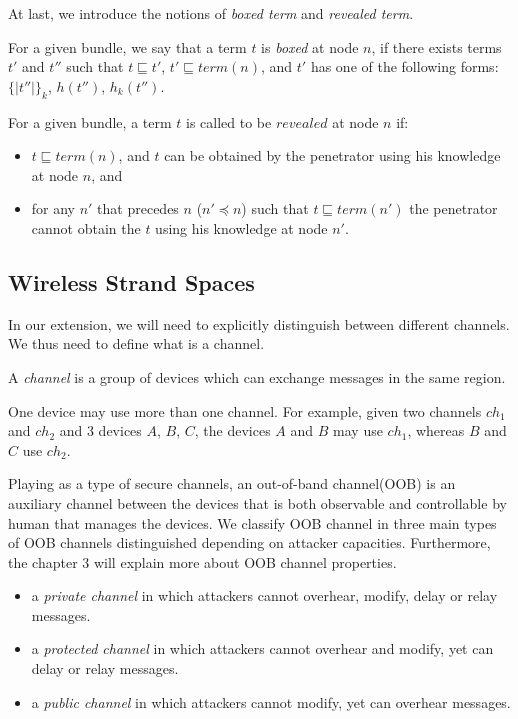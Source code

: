 At last, we introduce the notions of \emph{boxed term} and \emph{revealed term}.

\begin{Definition} 
For a given bundle, we say that a term $t$ is \emph{boxed} at node $n$, if there exists terms $t'$ and $t''$ such that $t \sqsubseteq t'$, $t' \sqsubseteq term(n)$, and $t'$ has one of the following forms: ${\{|t''|\}}_k$, $h(t'')$, $h_k(t'')$.
\end{Definition}

\begin{Definition}
For a given bundle, a term $t$ is called to be $revealed$ at node $n$ if:
\begin{itemize}
  \item $t \sqsubseteq term(n)$, and $t$ can be obtained by the penetrator using his knowledge at node $n$, and
  \item for any $n'$ that precedes $n$ ($n' \preceq n$) such that $t \sqsubseteq term(n')$ the penetrator cannot obtain the $t$ using his knowledge at node $n'$. 
\end{itemize} 
\end{Definition}

\subsection{Wireless Strand Spaces}\label{wirelessstrand}

In our extension, we will need to explicitly distinguish between different channels. We thus need to define what is a channel.

\begin{Definition}[Channel] A \emph{channel} is a group of devices which can exchange messages in the same region.
\end{Definition} 

One device may use more than one channel.
For example, given two channels $ch_1$ and $ch_2$ and 3 devices $A$, $B$, $C$, the devices $A$ and $B$ may use $ch_1$, whereas $B$ and $C$ use $ch_2$. 

Playing as a type of secure channels, an out-of-band channel(OOB) is an auxiliary channel between the devices that is both observable and controllable by human that manages the devices. We classify OOB channel in three main types of OOB channels distinguished depending on attacker capacities. Furthermore, the chapter 3 will explain more about OOB channel properties. 

\begin{itemize}
  \item a \textit{private channel} in which attackers cannot overhear, modify, delay or relay messages.
  \item a \textit{protected channel} in which attackers cannot overhear and modify, yet can delay or relay messages. 
  \item a \textit{public channel} in which attackers cannot modify, yet can overhear messages.
\end{itemize}

